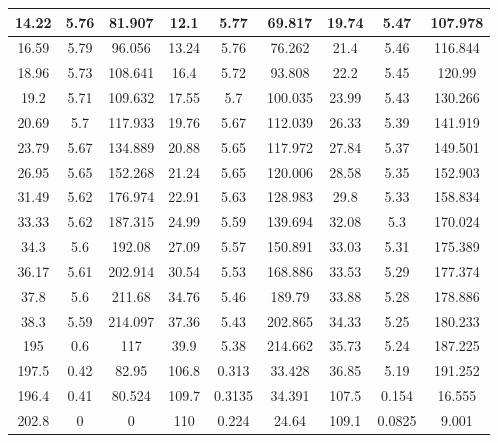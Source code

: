 \begin{table*}[]
\begin{tabular}{|c|c|c|c|c|c|c|c|c|}
14.22        & 5.76       & 81.907      & 12.1        & 5.77       & 69.817      & 19.74   & 5.47    & 107.978 \\ \hline
16.59        & 5.79       & 96.056      & 13.24       & 5.76       & 76.262      & 21.4    & 5.46    & 116.844 \\ \hline
18.96        & 5.73       & 108.641     & 16.4        & 5.72       & 93.808      & 22.2    & 5.45    & 120.99  \\ \hline
19.2         & 5.71       & 109.632     & 17.55       & 5.7        & 100.035     & 23.99   & 5.43    & 130.266 \\ \hline
20.69        & 5.7        & 117.933     & 19.76       & 5.67       & 112.039     & 26.33   & 5.39    & 141.919 \\ \hline
23.79        & 5.67       & 134.889     & 20.88       & 5.65       & 117.972     & 27.84   & 5.37    & 149.501 \\ \hline
26.95        & 5.65       & 152.268     & 21.24       & 5.65       & 120.006     & 28.58   & 5.35    & 152.903 \\ \hline
31.49        & 5.62       & 176.974     & 22.91       & 5.63       & 128.983     & 29.8    & 5.33    & 158.834 \\ \hline
33.33        & 5.62       & 187.315     & 24.99       & 5.59       & 139.694     & 32.08   & 5.3     & 170.024 \\ \hline
34.3         & 5.6        & 192.08      & 27.09       & 5.57       & 150.891     & 33.03   & 5.31    & 175.389 \\ \hline
36.17        & 5.61       & 202.914     & 30.54       & 5.53       & 168.886     & 33.53   & 5.29    & 177.374 \\ \hline
37.8         & 5.6        & 211.68      & 34.76       & 5.46       & 189.79      & 33.88   & 5.28    & 178.886 \\ \hline
38.3         & 5.59       & 214.097     & 37.36       & 5.43       & 202.865     & 34.33   & 5.25    & 180.233 \\ \hline
195          & 0.6        & 117         & 39.9        & 5.38       & 214.662     & 35.73   & 5.24    & 187.225 \\ \hline
197.5        & 0.42       & 82.95       & 106.8       & 0.313      & 33.428      & 36.85   & 5.19    & 191.252 \\ \hline
196.4        & 0.41       & 80.524      & 109.7       & 0.3135     & 34.391      & 107.5   & 0.154   & 16.555  \\ \hline
202.8        & 0          & 0           & 110         & 0.224      & 24.64       & 109.1   & 0.0825  & 9.001   \\ \hline

\end{tabular}
\end{table*}
